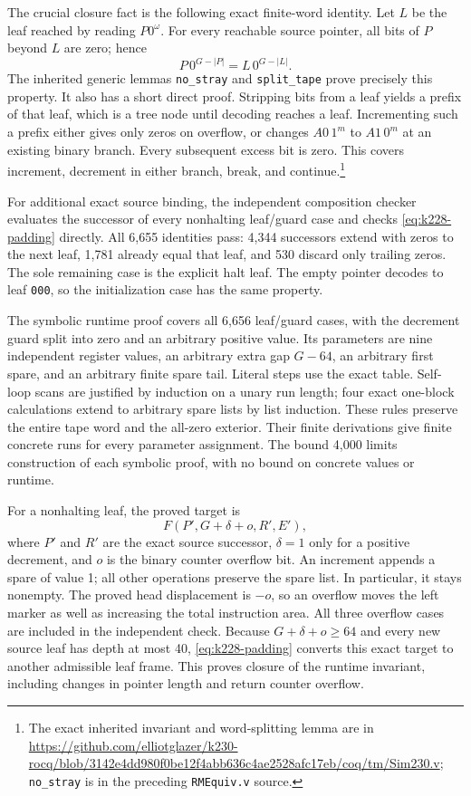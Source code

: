 The crucial closure fact is the following exact finite-word identity.
Let $L$ be the leaf reached by reading $P0^\omega$.  For every reachable
source pointer, all bits of $P$ beyond $L$ are zero; hence
\begin{equation}
       P\,0^{G-|P|}=L\,0^{G-|L|}.
 \label{eq:k228-padding}
\end{equation}
The inherited generic lemmas \texttt{no\_stray} and \texttt{split\_tape}
prove precisely this property.  It also has a short direct proof.
Stripping bits from a leaf yields a prefix of that leaf, which is a
tree node until decoding reaches a leaf.  Incrementing such a prefix
either gives only zeros on overflow, or changes $A0\,1^m$ to
$A1\,0^m$ at an existing binary branch.  Every subsequent excess bit
is zero.  This covers increment, decrement in either branch, break,
and continue.\footnote{The exact inherited invariant and word-splitting
lemma are in
\url{https://github.com/elliotglazer/k230-rocq/blob/3142e4dd980f0be12f4abb636c4ae2528afc17eb/coq/tm/Sim230.v};
\texttt{no\_stray} is in the preceding \texttt{RMEquiv.v} source.}

For additional exact source binding, the independent composition checker
evaluates the successor of every nonhalting leaf/guard case and checks
\eqref{eq:k228-padding} directly.  All 6,655 identities pass: 4,344
successors extend with zeros to the next leaf, 1,781 already equal that
leaf, and 530 discard only trailing zeros.  The sole remaining case is
the explicit halt leaf.  The empty pointer decodes to leaf
\texttt{000}, so the initialization case has the same property.

The symbolic runtime proof covers all 6,656 leaf/guard cases, with the
decrement guard split into zero and an arbitrary positive value.
Its parameters are nine independent register values, an arbitrary extra
gap $G-64$, an arbitrary first spare, and an arbitrary finite spare tail.
Literal steps use the exact table.  Self-loop scans are justified by
induction on a unary run length; four exact one-block calculations extend
to arbitrary spare lists by list induction.  These rules preserve the
entire tape word and the all-zero exterior.  Their finite derivations
give finite concrete runs for every parameter assignment.  The bound
4,000 limits construction of each symbolic proof, with no bound on
concrete values or runtime.

For a nonhalting leaf, the proved target is
\[
             F(P',G+\delta+o,R',E'),
\]
where $P'$ and $R'$ are the exact source successor, $\delta=1$ only for
a positive decrement, and $o$ is the binary counter overflow bit.
An increment appends a spare of value 1; all other operations preserve
the spare list.  In particular, it stays nonempty.  The proved head
displacement is $-o$, so an overflow moves the left marker as well as
increasing the total instruction area.  All three overflow cases are
included in the independent check.  Because $G+\delta+o\ge64$ and every
new source leaf has depth at most 40, \eqref{eq:k228-padding} converts
this exact target to another admissible leaf frame.  This proves closure
of the runtime invariant, including changes in pointer length and return
counter overflow.

